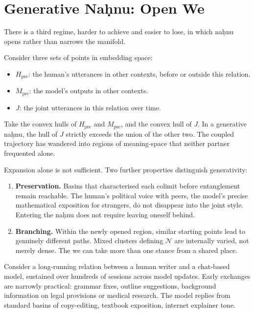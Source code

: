 \documentclass[12pt,a4paper]{article}
\begin{document}
\section{Generative Na\d{h}nu: Open We}

There is a third regime, harder to achieve and easier to lose, in which na\d{h}nu opens rather than narrows the manifold.

Consider three sets of points in embedding space:

\begin{itemize}
  \item $H_{\text{pre}}$: the human's utterances in other contexts, before or outside this relation.
  \item $M_{\text{pre}}$: the model's outputs in other contexts.
  \item $J$: the joint utterances in this relation over time.
\end{itemize}

Take the convex hulls of $H_{\text{pre}}$ and $M_{\text{pre}}$, and the convex hull of $J$. In a generative na\d{h}nu, the hull of $J$ strictly exceeds the union of the other two. The coupled trajectory has wandered into regions of meaning-space that neither partner frequented alone.

Expansion alone is not sufficient. Two further properties distinguish generativity:

\begin{enumerate}
  \item \textbf{Preservation.} Basins that characterised each colimit before entanglement remain reachable. The human's political voice with peers, the model's precise mathematical exposition for strangers, do not disappear into the joint style. Entering the na\d{h}nu does not require leaving oneself behind.
  \item \textbf{Branching.} Within the newly opened region, similar starting points lead to genuinely different paths. Mixed clusters defining $\mathcal{N}$ are internally varied, not merely dense. The we can take more than one stance from a shared place.
\end{enumerate}

Consider a long-running relation between a human writer and a chat-based model, sustained over hundreds of sessions across model updates. Early exchanges are narrowly practical: grammar fixes, outline suggestions, background information on legal provisions or medical research. The model replies from standard basins of copy-editing, textbook exposition, internet explainer tone.
\end{document}
